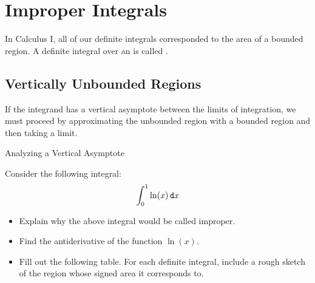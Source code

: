 
\section{Improper Integrals} In Calculus I,  all of our definite integrals corresponded to the area of a bounded region.  A definite integral over an  is called \emph{}.
\subsection{Vertically Unbounded Regions}\label{VertUnbounded}
If the integrand has a vertical asymptote between the limits of integration, we must proceed by approximating the unbounded region with a bounded region and then taking a limit.  

\begin{exercise}{Analyzing a Vertical Asymptote \Coffeecup \Coffeecup}\label{LogArea}

Consider the following integral: $$\int_0^1 \ln(x) \mathop{}\!\mathtt{d} x $$

\begin{itemize}
\item Explain why the above integral would be called improper. 


\item Find the antiderivative of the function $\ln(x)$.


\item Fill out the following table.  For each definite integral, include a rough sketch of the region whose signed area it corresponds to.  


\end{itemize}
\end{exercise}
